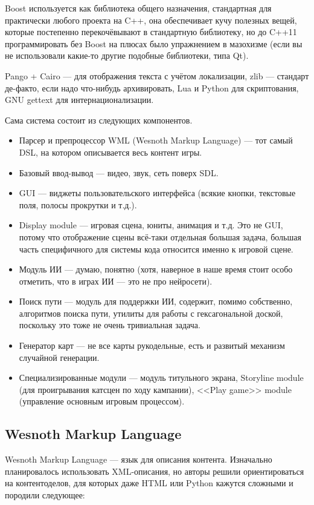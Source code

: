 \documentclass[a5paper]{article}
\begin{document}
Boost используется как библиотека общего назначения, стандартная для практически любого проекта на C++, она обеспечивает кучу полезных вещей, которые постепенно перекочёвывают в стандартную библиотеку, но до C++11 программировать без Boost на плюсах было упражнением в мазохизме (если вы не использовали какие-то другие подобные библиотеки, типа Qt).

Pango + Cairo --- для отображения текста с учётом локализации, zlib --- стандарт де-факто, если надо что-нибудь архивировать, Lua и Python для скриптования, GNU gettext для интернационализации.

Сама система состоит из следующих компонентов.

\begin{itemize}
    \item Парсер и препроцессор WML (Wesnoth Markup Language) --- тот самый DSL, на котором описывается весь контент игры.
    \item Базовый ввод-вывод --- видео, звук, сеть поверх SDL.
    \item GUI --- виджеты пользовательского интерфейса (всякие кнопки, текстовые поля, полосы прокрутки и т.д.).
    \item Display module --- игровая сцена, юниты, анимация и т.д. Это не GUI, потому что отображение сцены всё-таки отдельная большая задача, большая часть специфичного для системы кода относится именно к игровой сцене.
    \item Модуль ИИ --- думаю, понятно (хотя, наверное в наше время стоит особо отметить, что в играх ИИ --- это не про нейросети).
    \item Поиск пути --- модуль для поддержки ИИ, содержит, помимо собственно, алгоритмов поиска пути, утилиты для работы с гексагональной доской, поскольку это тоже не очень тривиальная задача.
    \item Генератор карт --- не все карты рукодельные, есть и развитый механизм случайной генерации.
    \item Специализированные модули --- модуль титульного экрана, Storyline module (для проигрывания катсцен по ходу кампании), <<Play game>> module (управление основным игровым процессом).
\end{itemize}

\subsection{Wesnoth Markup Language}

Wesnoth Markup Language --- язык для описания контента. Изначально планировалось использовать XML-описания, но авторы решили ориентироваться на контентоделов, для которых даже HTML или Python кажутся сложными и породили следующее:
\end{document}
